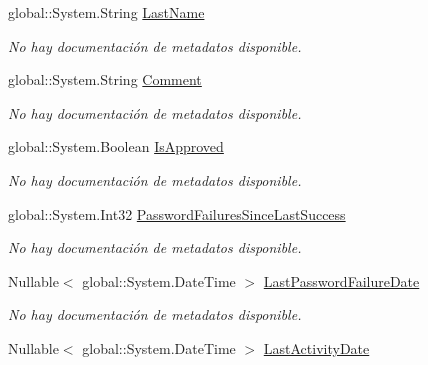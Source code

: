 \begin{DoxyCompactItemize}
global\-::\-System.\-String \hyperlink{class_game_memory_1_1_users_a440ecd49516fc34c62e82845bcefbb69}{Last\-Name}
\begin{DoxyCompactList}\small\item\em No hay documentación de metadatos disponible. \end{DoxyCompactList}\item 
global\-::\-System.\-String \hyperlink{class_game_memory_1_1_users_a78fc5aef90521ab4a0d0ffa82eb5a27a}{Comment}
\begin{DoxyCompactList}\small\item\em No hay documentación de metadatos disponible. \end{DoxyCompactList}\item 
global\-::\-System.\-Boolean \hyperlink{class_game_memory_1_1_users_a112ee494edcaeda109a5ea967b60273c}{Is\-Approved}
\begin{DoxyCompactList}\small\item\em No hay documentación de metadatos disponible. \end{DoxyCompactList}\item 
global\-::\-System.\-Int32 \hyperlink{class_game_memory_1_1_users_a58dec1e298fb45ba5d9110a151260392}{Password\-Failures\-Since\-Last\-Success}
\begin{DoxyCompactList}\small\item\em No hay documentación de metadatos disponible. \end{DoxyCompactList}\item 
Nullable$<$ global\-::\-System.\-Date\-Time $>$ \hyperlink{class_game_memory_1_1_users_a0383048727d3c375e860db6310087196}{Last\-Password\-Failure\-Date}
\begin{DoxyCompactList}\small\item\em No hay documentación de metadatos disponible. \end{DoxyCompactList}\item 
Nullable$<$ global\-::\-System.\-Date\-Time $>$ \hyperlink{class_game_memory_1_1_users_a86ea14d379459264427b6109be5a1a59}{Last\-Activity\-Date}

\end{DoxyCompactItemize}
